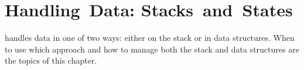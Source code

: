 
\chapter{Handling~Data: Stacks~and~States}

\expandafter\initial\Forth{} handles data in one of two ways: either
on the stack or in data structures. When to use which approach and how
to manage both the stack and data structures are the topics of this
chapter.


